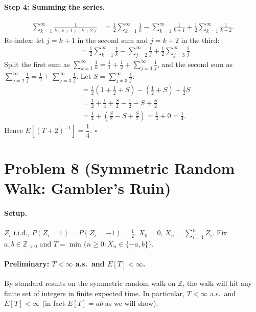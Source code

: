 \documentclass[11pt]{article}
\newcommand{\1}{\mathbf{1}}
\theoremstyle{plain}
\begin{document}
\paragraph{Step 4: Summing the series.}
\begin{align*}
  \sum_{k=1}^{\infty}\frac{1}{k(k+1)(k+2)}
  &= \frac{1}{2}\sum_{k=1}^{\infty}\frac{1}{k}
     - \sum_{k=1}^{\infty}\frac{1}{k+1}
     + \frac{1}{2}\sum_{k=1}^{\infty}\frac{1}{k+2}.
\end{align*}
Re-index: let $j=k+1$ in the second sum and $j=k+2$ in the third:
\begin{align*}
  &= \frac{1}{2}\sum_{k=1}^{\infty}\frac{1}{k}
     - \sum_{j=2}^{\infty}\frac{1}{j}
     + \frac{1}{2}\sum_{j=3}^{\infty}\frac{1}{j}.
\end{align*}
Split the first sum as $\sum_{k=1}^{\infty}\frac{1}{k}
=\frac{1}{1}+\frac{1}{2}+\sum_{j=3}^{\infty}\frac{1}{j}$, and the second sum as
$\sum_{j=2}^{\infty}\frac{1}{j}=\frac{1}{2}+\sum_{j=3}^{\infty}\frac{1}{j}$.
Let $S=\sum_{j=3}^{\infty}\frac{1}{j}$:
\begin{align*}
  &= \frac{1}{2}\!\left(1+\frac{1}{2}+S\right)
     - \!\left(\frac{1}{2}+S\right)
     + \frac{1}{2}S \\
  &= \frac{1}{2}+\frac{1}{4}+\frac{S}{2}
     - \frac{1}{2} - S
     + \frac{S}{2} \\
  &= \frac{1}{4} + \left(\frac{S}{2}-S+\frac{S}{2}\right)
   = \frac{1}{4} + 0
   = \frac{1}{4}.
\end{align*}
Hence $E\!\left[(T+2)^{-1}\right]=\dfrac{1}{4}$. $\square$

\section*{Problem 8 (Symmetric Random Walk: Gambler's Ruin)}

\paragraph{Setup.}
$Z_i$ i.i.d., $P(Z_i=1)=P(Z_i=-1)=\frac{1}{2}$. $X_0=0$, $X_n=\sum_{i=1}^nZ_i$.
Fix $a,b\in\mathbb{Z}_{>0}$ and $T=\min\{n\ge0:X_n\in\{-a,b\}\}$.

\paragraph{Preliminary: $T<\infty$ a.s.\ and $E[T]<\infty$.}
By standard results on the symmetric random walk on $\mathbb{Z}$, the walk
will hit any finite set of integers in finite expected time. In particular,
$T<\infty$ a.s.\ and $E[T]<\infty$ (in fact $E[T]=ab$ as we will show).
\end{document}

